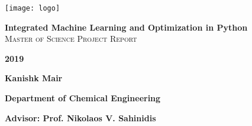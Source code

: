 \begin{titlepage}
\vbox{ }

\begin{center}
\texttt{[image: logo]}\\[2cm]
\end{center}
\begin{center}

\vbox{ }
{ \LARGE \textbf {Integrated Machine Learning\vspace{7.5pt}  and Optimization in Python\vspace{7.5pt}}}\\[1.5cm]

\scshape{\large Master of Science Project Report}\\[0.7cm]


\begin{center}\bfseries \large{2019}
\end{center}



\vbox{ }
\begin{center} \bfseries{Kanishk Mair}
\end{center}
{\bfseries Department of Chemical Engineering}

\begin{center} \bfseries {Advisor: Prof. Nikolaos V. Sahinidis}
\end{center}
\end{center}
\end{titlepage}